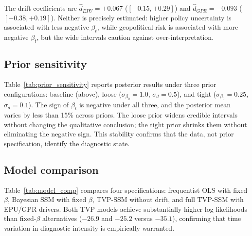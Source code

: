 The drift coefficients are $\hat{d}_{EPU} = +0.067$
($[-0.15, +0.29]$) and $\hat{d}_{GPR} = -0.093$
($[-0.38, +0.19]$). Neither is precisely estimated:
higher policy uncertainty is associated with less negative
$\beta_t$, while geopolitical risk is associated with more
negative $\beta_t$, but the wide intervals caution against
over-interpretation.



\subsection{Prior sensitivity}

Table~\ref{tab:prior_sensitivity} reports posterior results
under three prior configurations: baseline (above), loose
($\sigma_{\beta_0} = 1.0$, $\sigma_d = 0.5$), and tight
($\sigma_{\beta_0} = 0.25$, $\sigma_d = 0.1$). The sign
of $\beta_t$ is negative under all three, and the
posterior mean varies by less than 15\% across priors.
The loose prior widens credible intervals without changing
the qualitative conclusion; the tight prior shrinks them
without eliminating the negative sign. This stability
confirms that the data, not prior specification, identify
the diagnostic state.



\subsection{Model comparison}

Table~\ref{tab:model_comp} compares four specifications:
frequentist OLS with fixed $\beta$, Bayesian SSM with
fixed $\beta$, TVP-SSM without drift, and full TVP-SSM
with EPU/GPR drivers. Both TVP models achieve
substantially higher log-likelihoods than fixed-$\beta$
alternatives ($-26.9$ and $-25.2$ versus $-35.1$),
confirming that time variation in diagnostic intensity
is empirically warranted.



